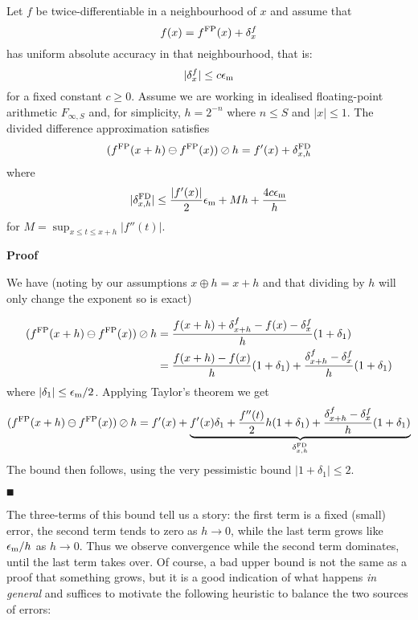 \begin{theorem} Let $f$ be twice-differentiable in a neighbourhood of $x$  and assume that 
\[
 f(x) = f^{\rm FP}(x) + \ensuremath{\delta}_x^f
\]
has uniform absolute accuracy in that neighbourhood, that is:
\[
|\ensuremath{\delta}_x^f| \ensuremath{\leq} c \ensuremath{\epsilon}_{\rm m}
\]
for a fixed constant $c \ensuremath{\geq} 0$.  Assume we are working in idealised floating-point arithmetic $F_{\ensuremath{\infty},S}$ and, for simplicity, $h = 2^{-n}$ where $n \ensuremath{\leq} S$ and $|x| \ensuremath{\leq} 1$. The divided difference approximation satisfies
\[
(f^{\rm FP}(x + h) \ensuremath{\ominus} f^{\rm FP}(x)) \ensuremath{\oslash} h = f'(x) + \ensuremath{\delta}_{x,h}^{\rm FD}
\]
where 
\[
|\ensuremath{\delta}_{x,h}^{\rm FD}| \ensuremath{\leq} {|f'(x)| \over 2} \ensuremath{\epsilon}_{\rm m} + M h +  {4c \ensuremath{\epsilon}_{\rm m} \over h}
\]
for $M = \sup_{x \ensuremath{\leq} t \ensuremath{\leq} x+h} |f''(t)|$.

\end{theorem}
\textbf{Proof}

We have (noting by our assumptions $x \ensuremath{\oplus} h = x + h$ and that dividing by $h$ will only change the exponent so is exact)


\begin{align*}
(f^{\rm FP}(x + h) \ensuremath{\ominus} f^{\rm FP}(x)) \ensuremath{\oslash} h &= {f(x + h) +  \ensuremath{\delta}^f_{x+h} - f(x) - \ensuremath{\delta}^f_x \over h} (1 + \ensuremath{\delta}_1) \\
&= {f(x+h) - f(x) \over h} (1 + \ensuremath{\delta}_1) + {\ensuremath{\delta}^f_{x+h}- \ensuremath{\delta}^f_x \over h} (1 + \ensuremath{\delta}_1)
\end{align*}
where $|\ensuremath{\delta}_1| \ensuremath{\leq} {\ensuremath{\epsilon}_{\rm m} / 2}$. Applying Taylor's theorem we get 
\[
(f^{\rm FP}(x + h) \ensuremath{\ominus} f^{\rm FP}(x)) \ensuremath{\oslash} h = f'(x) + \underbrace{f'(x) \ensuremath{\delta}_1 + {f''(t) \over 2} h (1 + \delta_1) + {\ensuremath{\delta}^f_{x+h}- \ensuremath{\delta}^f_x \over h} (1 + \ensuremath{\delta}_1)}_{\ensuremath{\delta}_{x,h}^{\rm FD}}
\]
The bound then follows, using the very pessimistic bound $|1 + \ensuremath{\delta}_1| \ensuremath{\leq} 2$.

\ensuremath{\QED}

The three-terms of this bound tell us a story: the first term is a fixed (small) error, the second term tends to zero as $h \rightarrow 0$, while the last term grows like $\ensuremath{\epsilon}_{\rm m}/h$ as $h \rightarrow 0$.  Thus we observe convergence while the second term dominates, until the last term takes over. Of course, a bad upper bound is not the same as a proof that something grows, but it is a good indication of  what happens \emph{in general} and suffices to motivate the following heuristic to balance the two sources of errors:

